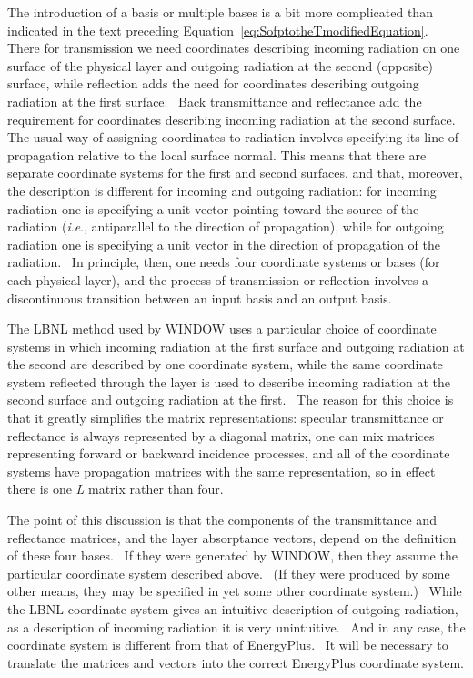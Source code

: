 The introduction of a basis or multiple bases is a bit more complicated than indicated in the text preceding Equation~\ref{eq:SofptotheTmodifiedEquation}.~ There for transmission we need coordinates describing incoming radiation on one surface of the physical layer and outgoing radiation at the second (opposite) surface, while reflection adds the need for coordinates describing outgoing radiation at the first surface.~ Back transmittance and reflectance add the requirement for coordinates describing incoming radiation at the second surface.~ The usual way of assigning coordinates to radiation involves specifying its line of propagation relative to the local surface normal. This means that there are separate coordinate systems for the first and second surfaces, and that, moreover, the description is different for incoming and outgoing radiation: for incoming radiation one is specifying a unit vector pointing toward the source of the radiation (\emph{i}.\emph{e}., antiparallel to the direction of propagation), while for outgoing radiation one is specifying a unit vector in the direction of propagation of the radiation.~ In principle, then, one needs four coordinate systems or bases (for each physical layer), and the process of transmission or reflection involves a discontinuous transition between an input basis and an output basis.

The LBNL method used by WINDOW uses a particular choice of coordinate systems in which incoming radiation at the first surface and outgoing radiation at the second are described by one coordinate system, while the same coordinate system reflected through the layer is used to describe incoming radiation at the second surface and outgoing radiation at the first.~ The reason for this choice is that it greatly simplifies the matrix representations: specular transmittance or reflectance is always represented by a diagonal matrix, one can mix matrices representing forward or backward incidence processes, and all of the coordinate systems have propagation matrices with the same representation, so in effect there is one \emph{L} matrix rather than four.

The point of this discussion is that the components of the transmittance and reflectance matrices, and the layer absorptance vectors, depend on the definition of these four bases.~ If they were generated by WINDOW, then they assume the particular coordinate system described above.~ (If they were produced by some other means, they may be specified in yet some other coordinate system.)~ While the LBNL coordinate system gives an intuitive description of outgoing radiation, as a description of incoming radiation it is very unintuitive.~ And in any case, the coordinate system is different from that of EnergyPlus.~ It will be necessary to translate the matrices and vectors into the correct EnergyPlus coordinate system.

